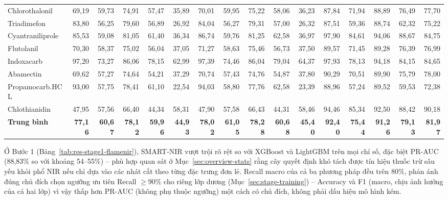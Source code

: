 \documentclass[10pt,twocolumn,twoside]{article}
\begin{document}
\begin{table}[htbp]
{\begin{tabular}{|l|rrrrr|rrrrr|rrrrr|}
Chlorothalonil & 69,19 & 59,73 & 74,91 & 57,47 & 35,89 & 70,01 & 59,95 & 75,22 & 58,06 & 36,23 & 87,84 & 71,94 & 88,89 & 76,49 & 77,70 \\
Triadimefon & 83,80 & 56,25 & 79,60 & 56,89 & 26,92 & 84,04 & 56,27 & 79,31 & 57,00 & 26,32 & 87,51 & 59,36 & 88,74 & 62,32 & 75,22 \\
Cyantraniliprole & 85,53 & 59,08 & 81,05 & 61,40 & 36,34 & 86,74 & 59,76 & 81,25 & 62,58 & 36,97 & 97,90 & 84,61 & 94,06 & 88,67 & 84,75 \\
Flutolanil & 70,30 & 58,37 & 75,02 & 56,04 & 37,05 & 71,27 & 58,63 & 75,46 & 56,73 & 37,50 & 89,57 & 71,45 & 89,28 & 76,39 & 76,99 \\
Indoxacarb & 97,20 & 73,27 & 86,06 & 78,15 & 62,99 & 97,39 & 74,46 & 86,04 & 79,04 & 64,37 & 97,93 & 78,13 & 94,18 & 84,15 & 84,65 \\
Abamectin & 69,62 & 57,27 & 74,64 & 54,21 & 37,29 & 70,74 & 57,43 & 74,76 & 54,87 & 37,80 & 90,29 & 70,51 & 89,90 & 75,79 & 78,00 \\
Propamocarb.HCL & 93,00 & 57,75 & 78,41 & 61,10 & 22,54 & 94,03 & 58,80 & 77,76 & 62,58 & 23,39 & 88,96 & 57,24 & 89,52 & 59,53 & 72,38 \\
Chlothianidin & 47,95 & 57,56 & 66,40 & 44,34 & 58,31 & 47,90 & 57,58 & 66,43 & 44,31 & 58,46 & 94,46 & 85,34 & 92,50 & 88,42 & 90,18 \\
\hline
\textbf{Trung bình} & \textbf{77,16} & \textbf{60,67} & \textbf{78,12} & \textbf{59,96} & \textbf{44,93} & \textbf{78,02} & \textbf{61,05} & \textbf{78,28} & \textbf{60,68} & \textbf{45,40} & \textbf{92,40} & \textbf{75,44} & \textbf{91,26} & \textbf{79,13} & \textbf{81,97} \\
\hline
\end{tabular}%
}
\end{table}

Ở Bước 1 (Bảng~\ref{tab:res-stage1-flamenir}), SMART-NIR vượt trội rõ rệt so
với XGBoost và LightGBM trên mọi chỉ số, đặc biệt PR-AUC (88,83\% so với
khoảng 54--55\%) -- phù hợp quan sát ở Mục~\ref{sec:overview-stats} rằng cây
quyết định khó tách được tín hiệu thuốc trừ sâu yếu khỏi phổ NIR nếu chỉ
dựa vào các nhát cắt theo từng đặc trưng đơn lẻ. Recall macro của cả ba
phương pháp đều trên 80\%, phản ánh đúng chủ đích chọn ngưỡng ưu tiên Recall
$\geq 90\%$ cho riêng lớp dương (Mục~\ref{sec:stage-training}) -- Accuracy
và F1 (macro, chịu ảnh hưởng của cả hai lớp) vì vậy thấp hơn PR-AUC (không
phụ thuộc ngưỡng) một cách có chủ đích, không phải dấu hiệu mô hình kém.
\end{document}
